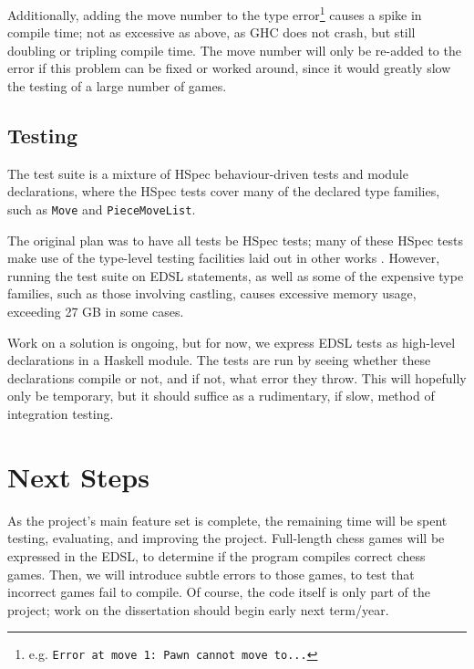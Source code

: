 \documentclass[12pt, a4paper, bibliography=totocnumbered]{scrartcl}
\begin{document}
Additionally, adding the move number to the type error\footnote{e.g. \lstinline[basicstyle=\ttfamily]{Error at move 1: Pawn cannot move to...}} causes a spike in compile time; not as excessive as above, as GHC does not crash, but still doubling or tripling compile time. The move number will only be re-added to the error if this problem can be fixed or worked around, since it would greatly slow the testing of a large number of games.

\subsection{Testing}

The test suite is a mixture of HSpec behaviour-driven tests \cite{hspec} and module declarations, where the HSpec tests cover many of the declared type families, such as \lstinline[basicstyle=\ttfamily]{Move} and \lstinline[basicstyle=\ttfamily]{PieceMoveList}.

The original plan was to have all tests be HSpec tests; many of these HSpec tests make use of the type-level testing facilities laid out in other works \cite{mezzo}. However, running the test suite on EDSL statements, as well as some of the expensive type families, such as those involving castling, causes excessive memory usage, exceeding 27 GB in some cases.

Work on a solution is ongoing, but for now, we express EDSL tests as high-level declarations in a Haskell module. The tests are run by seeing whether these declarations compile or not, and if not, what error they throw. This will hopefully only be temporary, but it should suffice as a rudimentary, if slow, method of integration testing.

\section{Next Steps}

As the project's main feature set is complete, the remaining time will be spent testing, evaluating, and improving the project. Full-length chess games will be expressed in the EDSL, to determine if the program compiles correct chess games. Then, we will introduce subtle errors to those games, to test that incorrect games fail to compile. Of course, the code itself is only part of the project; work on the dissertation should begin early next term/year.

\end{document}
